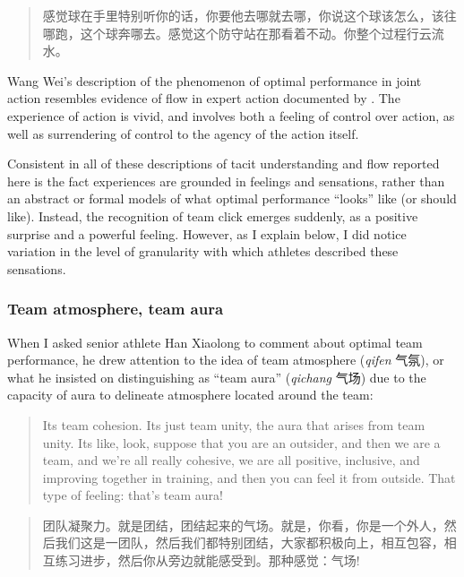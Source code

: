 \begin{CJK}{UTF8}{gbsn}
  \begin{quote}
    	感觉球在手里特别听你的话，你要他去哪就去哪，你说这个球该怎么，该往哪跑，这个球奔哪去。感觉这个防守站在那看着不动。你整个过程行云流水。
  \end{quote}

Wang Wei's description of the phenomenon of optimal performance in joint action resembles evidence of flow in expert action documented by \textcite{Jackson1992}.  The experience of action is vivid, and involves both a feeling of control over action, as well as surrendering of control to the agency of the action itself.

Consistent in all of these descriptions of tacit understanding and flow reported here is the fact experiences are grounded in feelings and sensations, rather than an abstract or formal models of what optimal performance ``looks'' like (or should like).  Instead, the recognition of team click emerges suddenly, as a positive surprise and a powerful feeling.  However, as I explain below, I did notice variation in the level of granularity with which athletes described these sensations.


\subsubsection{Team atmosphere, team aura}

When I asked senior athlete Han Xiaolong to comment about optimal team performance, he drew attention to the idea of team atmosphere (\textit{qifen} 气氛), or what he insisted on distinguishing as ``team aura'' (\textit{qichang} 气场) due to the capacity of aura to delineate atmosphere located around the team:

    \begin{quote}
      Its team cohesion.  Its just team unity, the aura that arises from team unity.  Its like, look, suppose that you are an outsider, and then we are a team, and we’re all really cohesive, we are all positive, inclusive, and improving together in training, and then you can feel it from outside.  That type of feeling: that's team aura!
    \end{quote}

    \begin{quote}
      团队凝聚力。就是团结，团结起来的气场。就是，你看，你是一个外人，然后我们这是一团队，然后我们都特别团结，大家都积极向上，相互包容，相互练习进步，然后你从旁边就能感受到。那种感觉：气场! 
    \end{quote}


\end{CJK}
